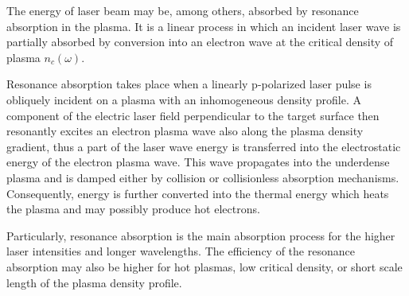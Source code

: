 The energy of laser beam may be, among others, absorbed by resonance absorption in the plasma. It is a linear process in which an incident laser wave is partially absorbed by conversion into an electron wave at the critical density of plasma $ n_c (\omega) $.

Resonance absorption takes place when a linearly p-polarized laser pulse is obliquely incident on a plasma with an inhomogeneous density profile. A component of the electric laser field perpendicular to the target surface then resonantly excites an electron plasma wave also along the plasma density gradient, thus a part of the laser wave energy is transferred into the electrostatic energy of the electron plasma wave. This wave propagates into the underdense plasma and is damped either by collision or collisionless absorption mechanisms. Consequently, energy is further converted into the thermal energy which heats the plasma and may possibly produce hot electrons.

Particularly, resonance absorption is the main absorption process for the higher laser intensities and longer wavelengths. The efficiency of the resonance absorption may also be higher for hot plasmas, low critical density, or short scale length of the plasma density profile.
